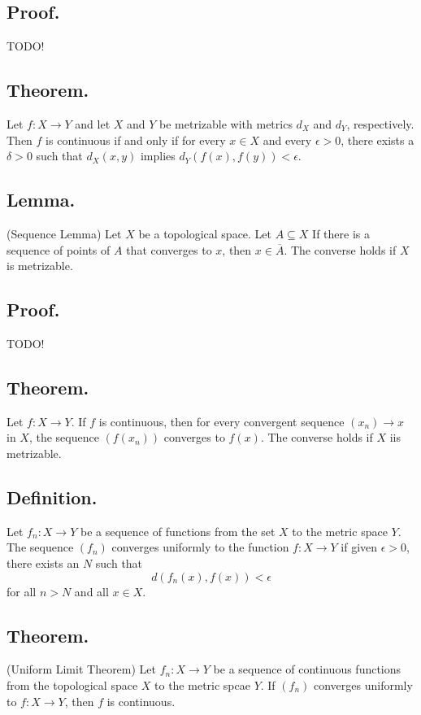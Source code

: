 \documentclass[titlepage]{article}
\begin{document}
\subsection{Proof.} TODO!

\subsection{Theorem.} Let $f: X \to Y$ and let $X$ and $Y$ be metrizable with metrics $d_{X}$ and $d_{Y}$, respectively. Then $f$ is continuous if and only if for every $x \in X$ and every $\epsilon > 0$, there exists a $\delta > 0$ such that $d_{X}(x, y)$ implies $d_{Y}(f(x), f(y)) < \epsilon$.

\subsection{Lemma.} (Sequence Lemma) Let $X$ be a topological space. Let $A \subseteq X$ If there is a sequence of points of $A$ that converges to $x$, then $x \in \overline{A}$. The converse holds if $X$ is metrizable.

\subsection{Proof.} TODO!

\subsection{Theorem.} Let $f: X \to Y$. If $f$ is continuous, then for every convergent sequence $(x_{n}) \to x$ in $X$, the sequence $(f(x_{n}))$ converges to $f(x)$. The converse holds if $X$ iis metrizable.

\subsection{Definition.} Let $f_{n}: X \to Y$ be a sequence of functions from the set $X$ to the metric space $Y$. The sequence $(f_{n})$ converges uniformly to the function $f: X \to Y$ if given $\epsilon > 0$, there exists an $N$ such that 
$$d(f_{n}(x), f(x)) < \epsilon$$
for all $n > N$ and all $x \in X$.

\subsection{Theorem.} (Uniform Limit Theorem) Let $f_{n}: X \to Y$ be a sequence of continuous functions from the topological space $X$ to the metric spcae $Y$. If $(f_{n})$ converges uniformly to $f: X \to Y$, then $f$ is continuous.
\end{document}
